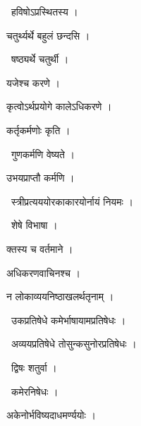 \documentclass[10pt, openany, oneside]{book}
\begin{document}
\par\noindent\hspace{1.5em}{\vps वा॰}~{\qt हविषोऽप्रस्थितस्य ।}

\noindent चतुर्थ्यर्थे बहुलं छन्दसि ।

\par\noindent\hspace{1.5em}{\vps वा॰}~{\qt षष्ठ्यर्थे चतुर्थी ।}

\noindent यजेश्च करणे ।

\noindent कृत्वोऽर्थप्रयोगे कालेऽधिकरणे ।

\noindent कर्तृकर्मणोः कृति ।

\par\noindent\hspace{1.5em}{\vps वा॰}~{\qt गुणकर्मणि वेष्यते ।}

\noindent उभयप्राप्तौ कर्मणि ।

\par\noindent\hspace{1.5em}{\vps वा॰}~{\qt स्त्रीप्रत्यययोरकाकारयोर्नायं नियमः ।}

\par\noindent\hspace{1.5em}{\vps वा॰}~{\qt शेषे विभाषा ।}

\noindent क्तस्य च वर्तमाने ।

\noindent अधिकरणवाचिनश्च ।

\noindent न लोकाव्ययनिष्ठाखलर्थतृनाम् ।

\par\noindent\hspace{1.5em}{\vps वा॰}~{\qt उकप्रतिषेधे कमेर्भाषायामप्रतिषेधः ।}

\par\noindent\hspace{1.5em}{\vps वा॰}~{\qt अव्ययप्रतिषेधे तोसुन्कसुनोरप्रतिषेधः ।}

\par\noindent\hspace{1.5em}{\vps वा॰}~{\qt द्विषः शतुर्वा ।}

\par\noindent\hspace{1.5em}{\vps वा॰}~{\qt कमेरनिषेधः ।}

\noindent अकेनोर्भविष्यदाधमर्ण्ययोः ।
\end{document}
